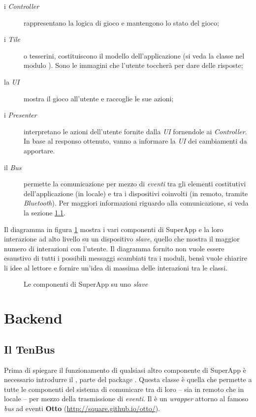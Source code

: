 \begin{description}
\item[i \textit{Controller}] rappresentano la logica di gioco e mantengono lo stato del gioco;
\item[i \textit{Tile}] o tesserini, costituiscono il modello dell'applicazione (si veda la classe  nel modulo ). Sono le immagini che l'utente toccherà per dare delle risposte;
\item[la \textit{UI}] mostra il gioco all'utente e raccoglie le sue azioni;
\item[i \textit{Presenter}] interpretano le azioni dell'utente fornite dalla \textit{UI} fornendole ai \textit{Controller}. In base al responso ottenuto, vanno a informare la \textit{UI} dei cambiamenti da apportare.
\item[il \textit{Bus}] permette la comunicazione per mezzo di \textit{eventi} tra gli elementi costitutivi dell'applicazione (in locale) e tra i dispositivi coinvolti (in remoto, tramite \textit{Bluetooth}). Per maggiori informazioni riguardo alla comunicazione, si veda la sezione \ref{subsec:tenbus}.
\end{description}

Il diagramma in figura \ref{fig:components} mostra i vari componenti di SuperApp e la loro interazione ad alto livello su un dispositivo \textit{slave}, quello che mostra il maggior numero di interazioni con l'utente. Il diagramma fornito non vuole essere esaustivo di tutti i possibili messaggi scambiati tra i moduli, bensì vuole chiarire li idee al lettore e fornire un'idea di massima delle interazioni tra le classi.

\begin{figure}[h!]
\caption{Le componenti di SuperApp su uno \textit{slave}}
\label{fig:components}
\end{figure}


\section{Backend}

\subsection{Il TenBus}
\label{subsec:tenbus}
Prima di spiegare il funzionamento di qualsiasi altro componente di SuperApp è necessario introdurre il , parte del package . Questa classe è quella che permette a tutte le componenti del sistema di comunicare tra di loro -- sia in remoto che in locale -- per mezzo della trasmissione di \textit{eventi}. Il  è un \textit{wrapper} attorno al famoso \textit{bus} ad eventi \textbf{Otto} (\url{http://square.github.io/otto/}).

